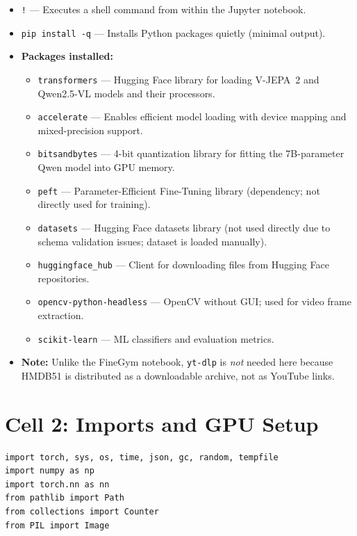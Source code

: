 \begin{explanation}
\begin{itemize}[nosep]
  \item \texttt{!} --- Executes a shell command from within the Jupyter notebook.
  \item \texttt{pip install -q} --- Installs Python packages quietly (minimal output).
  \item \textbf{Packages installed:}
  \begin{itemize}[nosep]
    \item \texttt{transformers} --- Hugging Face library for loading V-JEPA~2 and Qwen2.5-VL models and their processors.
    \item \texttt{accelerate} --- Enables efficient model loading with device mapping and mixed-precision support.
    \item \texttt{bitsandbytes} --- 4-bit quantization library for fitting the 7B-parameter Qwen model into GPU memory.
    \item \texttt{peft} --- Parameter-Efficient Fine-Tuning library (dependency; not directly used for training).
    \item \texttt{datasets} --- Hugging Face datasets library (not used directly due to schema validation issues; dataset is loaded manually).
    \item \texttt{huggingface\_hub} --- Client for downloading files from Hugging Face repositories.
    \item \texttt{opencv-python-headless} --- OpenCV without GUI; used for video frame extraction.
    \item \texttt{scikit-learn} --- ML classifiers and evaluation metrics.
  \end{itemize}
  \item \textbf{Note:} Unlike the FineGym notebook, \texttt{yt-dlp} is \textit{not} needed here because HMDB51 is distributed as a downloadable archive, not as YouTube links.
\end{itemize}
\end{explanation}

\newpage
\section{Cell 2: Imports and GPU Setup}

\begin{lstlisting}
import torch, sys, os, time, json, gc, random, tempfile
import numpy as np
import torch.nn as nn
from pathlib import Path
from collections import Counter
from PIL import Image
\end{lstlisting}

